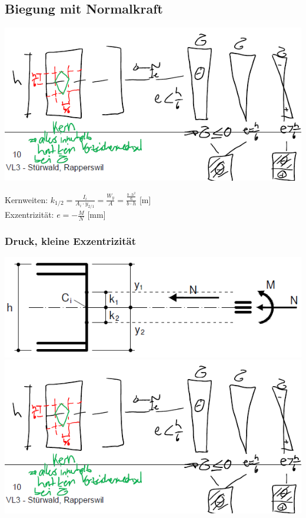 \begin{multicols}{2}
	
	
	\subsection{Biegung mit Normalkraft}
	
	
	\includegraphics[width=\linewidth]{images/Risse6Kern.PNG}
	
	
	Kernweiten:	 $ k_{1/2} = \frac{I_i}{A_i \cdot y_{2/1}} = \frac{W_y}{A} = \frac{  \frac{b \cdot h^2}{6}  }{b \cdot h} $  [m] \\	
	Exzentrizität: $ e = -\frac{M}{N} $ [mm]
	
	
	
	\subsubsection{Druck, kleine Exzentrizität}
	
	
	\includegraphics[width=0.7\linewidth]{images/Risse5klExPNG} \\
	\includegraphics[width=\linewidth]{images/Risse6Kern.PNG}
	

\end{multicols}
